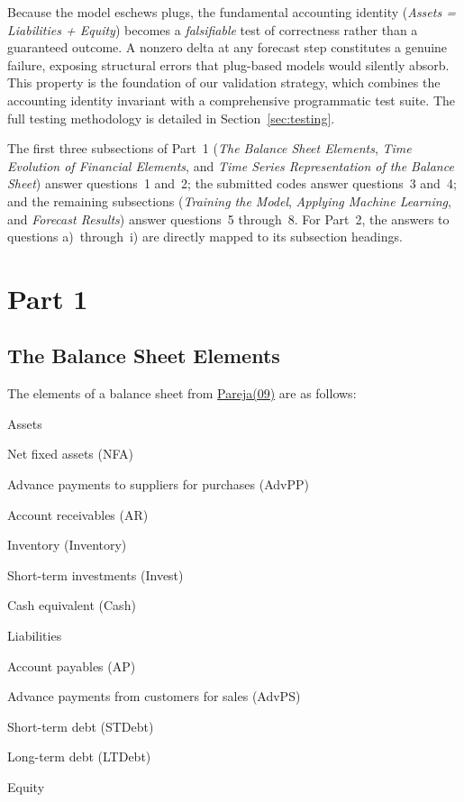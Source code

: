 \documentclass[12pt,a4paper]{article}
\begin{document}
Because the model eschews plugs, the fundamental accounting identity
(\emph{Assets = Liabilities + Equity}) becomes a \emph{falsifiable} test
of correctness rather than a guaranteed outcome. A nonzero delta at any
forecast step constitutes a genuine failure, exposing structural errors
that plug-based models would silently absorb. This property is the
foundation of our validation strategy, which combines the accounting
identity invariant with a comprehensive programmatic test suite. The
full testing methodology is detailed in Section~\ref{sec:testing}.

The first three subsections of Part~1 (\emph{The Balance Sheet
Elements}, \emph{Time Evolution of Financial Elements}, and \emph{Time
Series Representation of the Balance Sheet}) answer questions~1 and~2;
the submitted codes answer questions~3 and~4; and the remaining
subsections (\emph{Training the Model}, \emph{Applying Machine
Learning}, and \emph{Forecast Results}) answer questions~5 through~8.
For Part~2, the answers to questions a)~through~i) are directly mapped
to its subsection headings.

\section{Part 1}
\label{sec:part1}

\subsection{The Balance Sheet Elements}

The elements of a balance sheet from \hyperlink{ref:pareja09}{Pareja(09)} are as follows:

Assets

Net fixed assets (NFA)

Advance payments to suppliers for purchases (AdvPP)

Account receivables (AR)

Inventory (Inventory)

Short-term investments (Invest)

Cash equivalent (Cash)

Liabilities

Account payables (AP)

Advance payments from customers for sales (AdvPS)

Short-term debt (STDebt)

Long-term debt (LTDebt)

Equity
\end{document}
